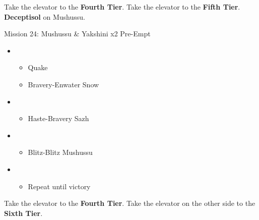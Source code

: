\begin{multicols}{2}
Take the elevator to the \textbf{Fourth Tier}.
Take the elevator to the \textbf{Fifth Tier}.
\textbf{Deceptisol} on Mushussu.

\begin{battle}{Mission 24: Mushussu \& Yakshini x2 Pre-Empt}
\begin{itemize}
    \item \first
    \begin{itemize}
        \item Quake
        \item Bravery-Enwater Snow
    \end{itemize}
    \item \fifth
    \begin{itemize}
        \item Haste-Bravery Sazh
    \end{itemize}
    \item \fourth
    \begin{itemize}
        \item Blitz-Blitz Mushussu
    \end{itemize}
    \item \second
    \begin{itemize}
        \item Repeat until victory
    \end{itemize}
\end{itemize}
\end{battle}

Take the elevator to the \textbf{Fourth Tier}.
Take the elevator on the other side to the \textbf{Sixth Tier}.


\end{multicols}
